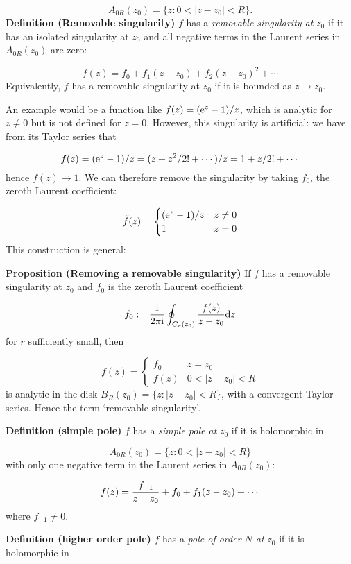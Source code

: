 \documentclass[12pt,a4paper]{article}
\def\D{ {\rm d} }
\def\I{ {\rm i} }
\def\E{ {\rm e} }
\begin{document}
\[
A_{0R}(z_0) = \{z : 0 < |z - z_0| < R \}.
\]
\textbf{Definition (Removable singularity)} $f$ has a \emph{removable singularity at} $z_0$ if it has an isolated singularity at $z_0$ and all negative terms in the Laurent series in $A_{0R}(z_0)$ are zero:

\[
f(z) = f_0 + f_1 (z-z_0) + f_2 (z-z_0)^2 + \cdots
\]
Equivalently, $f$ has a removable singularity at $z_0$ if it is bounded as $z \rightarrow z_0$.

An example would be a function like $f(z) = (\E^z - 1) / z$, which is analytic for $z \neq 0$ but is not defined for $z = 0$. However, this singularity is artificial: we have from its Taylor series that

\[
f(z) = (\E^{z} - 1)/z = (z + z^2 / 2! + \cdots)/z = 1 + z/2! + \cdots
\]
hence $f(z) \rightarrow 1$. We can therefore remove the singularity by taking $f_0$, the zeroth Laurent coefficient:

\[
\tilde f(z) = \begin{cases}
    (\E^z - 1)/ z & z \neq 0 \\
    1 & z = 0
    \end{cases}
\]
This construction is general:

\textbf{Proposition (Removing a removable singularity)} If  $f$ has a removable singularity at $z_0$ and $f_0$ is the zeroth Laurent coefficient

\[
    f_0 := {1 \over 2 \pi \I} \oint_{C_r(z_0)} {f(z) \over z-z_0} \D z
\]
for $r$ sufficiently small, then

\[
\tilde f(z) = \begin{cases} f_0 & z = z_0 \\
                                f(z) & 0 < |z-z_0| < R
                                \end{cases}
\]
is analytic in the disk $B_R(z_0) = \{ z : |z-z_0| < R \}$, with a convergent Taylor series. Hence the term `removable singularity'.

\textbf{Definition (simple pole)} $f$ has a  \emph{simple pole at} $z_0$ if it is holomorphic in

\[
  A_{0R}(z_0) = \{z : 0 < |z - z_0| < R \}
\]
with only one negative term in the Laurent series in $A_{0R}(z_0)$:

\[
  f(z) = {f_{-1} \over z - z_0}  + f_0 + f_1 (z - z_0) + \cdots
\]
where $f_{-1} \neq 0$.

\textbf{Definition (higher order pole)} $f$ has a  \emph{pole of order $N$ at} ${z_0}$ if it is holomorphic in
\end{document}
